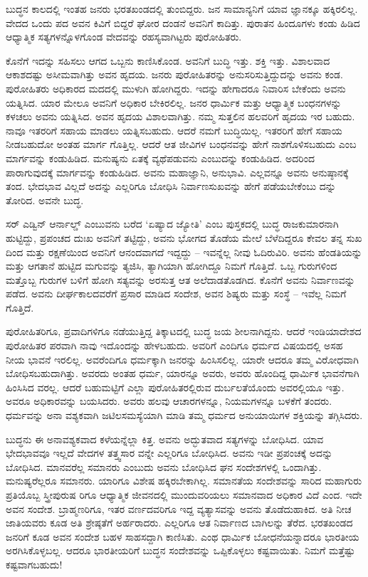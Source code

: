 ಬುದ್ಧನ ಕಾಲದಲ್ಲಿ ಇಂತಹ ಜನರು ಭರತಖಂಡದಲ್ಲಿ ತುಂಬಿದ್ದರು. ಜನ ಸಾಮಾನ್ಯನಿಗೆ ಯಾವ ಜ್ಞಾನಕ್ಕೂ ಹಕ್ಕಿರಲಿಲ್ಲ. ವೇದದ ಒಂದು ಪದ ಅವನ ಕಿವಿಗೆ ಬಿದ್ದರೆ ಘೋರ ದಂಡನೆ ಅವನಿಗೆ ಕಾದಿತ್ತು. ಪುರಾತನ ಹಿಂದೂಗಳು ಕಂಡು ಹಿಡಿದ ಆಧ್ಯಾತ್ಮಿಕ ಸತ್ಯಗಳನ್ನೊಳಗೊಂಡ ವೇದವನ್ನು ರಹಸ್ಯವಾಗಿಟ್ಟರು ಪುರೋಹಿತರು.

ಕೊನೆಗೆ ಇದನ್ನು ಸಹಿಸಲು ಆಗದ ಒಬ್ಬನು ಕಾಣಿಸಿಕೊಂಡ. ಅವನಿಗೆ ಬುದ್ಧಿ ಇತ್ತು. ಶಕ್ತಿ ಇತ್ತು. ವಿಶಾಲವಾದ ಆಕಾಶದಷ್ಟು ಅಸೀಮವಾಗಿತ್ತು ಅವನ ಹೃದಯ. ಜನರು ಪುರೋಹಿತರನ್ನು ಅನುಸರಿಸುತ್ತಿದ್ದುದನ್ನು ಅವನು ಕಂಡ. ಪುರೋಹಿತರು ಅಧಿಕಾರದ ಮದದಲ್ಲಿ ಮುಳುಗಿ ಹೋಗಿದ್ದರು. ಇದನ್ನು ಹೇಗಾದರೂ ನಿವಾರಿಸ ಬೇಕೆಂದು ಅವನು ಯತ್ನಿಸಿದ. ಯಾರ ಮೇಲೂ ಅವನಿಗೆ ಅಧಿಕಾರ ಬೇಕಿರಲಿಲ್ಲ. ಜನರ ಧಾರ್ಮಿಕ ಮತ್ತು ಆಧ್ಯಾತ್ಮಿಕ ಬಂಧನಗಳನ್ನು ಕಳಚಲು ಅವನು ಯತ್ನಿಸಿದ. ಅವನ ಹೃದಯ ವಿಶಾಲವಾಗಿತ್ತು. ನಮ್ಮ ಸುತ್ತಲಿನ ಹಲವರಿಗೆ ಹೃದಯ ಇರ ಬಹುದು. ನಾವೂ ಇತರರಿಗೆ ಸಹಾಯ ಮಾಡಲು ಯತ್ನಿಸಬಹುದು. ಆದರೆ ನಮಗೆ ಬುದ್ಧಿಯಿಲ್ಲ. ಇತರರಿಗೆ ಹೇಗೆ ಸಹಾಯ ನೀಡಬಹುದೋ ಅಂತಹ ಮಾರ್ಗ ಗೊತ್ತಿಲ್ಲ. ಆದರೆ ಆತ ಜೀವಿಗಳ ಬಂಧನವನ್ನು ಹೇಗೆ ನಾಶಗೊಳಿಸಬಹುದು ಎಂಬ ಮಾರ್ಗವನ್ನು ಕಂಡುಹಿಡಿದ. ಮನುಷ್ಯನು ಏತಕ್ಕೆ ವ್ಯಥೆಪಡುವನು ಎಂಬುದನ್ನು ಕಂಡುಹಿಡಿದ. ಅದರಿಂದ ಪಾರಾಗುವುದಕ್ಕೆ ಮಾರ್ಗವನ್ನು ಕಂಡುಹಿಡಿದ. ಅವನು ಮಹಾಜ್ಞಾನಿ, ಅನುಭಾವಿ. ಎಲ್ಲವನ್ನೂ ಅವನು ಅನುಷ್ಠಾನಕ್ಕೆ ತಂದ. ಭೇದಭಾವ ವಿಲ್ಲದೆ ಅದನ್ನು ಎಲ್ಲರಿಗೂ ಬೋಧಿಸಿ ನಿರ್ವಾಣಸುಖವನ್ನು ಹೇಗೆ ಪಡೆಯಬೇಕೆಂಬು ದನ್ನು ತೋರಿದ. ಅವನೇ ಬುದ್ಧ.

ಸರ್​ ಎಡ್ವಿನ್​ ಆರ್ನಾಲ್ಡ್​ ಎಂಬುವನು ಬರೆದ ‘ಏಷ್ಯಾದ ಜ್ಯೋತಿ’ ಎಂಬ ಪುಸ್ತಕದಲ್ಲಿ ಬುದ್ಧ ರಾಜಕುಮಾರನಾಗಿ ಹುಟ್ಟಿದ್ದು, ಪ್ರಪಂಚದ ದುಃಖ ಅವನಿಗೆ ತಟ್ಟಿದ್ದು, ಅವನು ಭೋಗದ ತೊಡೆಯ ಮೇಲೆ ಬೆಳೆದಿದ್ದರೂ ಕೇವಲ ತನ್ನ ಸುಖ ದಿಂದ ಮತ್ತು ರಕ್ಷಣೆಯಿಂದ ಅವನಿಗೆ ಆನಂದವಾಗದೆ ಇದ್ದದ್ದು – ಇವನ್ನೆಲ್ಲ ನೀವು ಓದಿರುವಿರಿ. ಅವನು ಹೆಂಡತಿಯನ್ನು ಮತ್ತು ಆಗತಾನೆ ಹುಟ್ಟಿದ ಮಗುವನ್ನು ತ್ಯಜಿಸಿ, ತ್ಯಾಗಿಯಾಗಿ ಹೋಗಿದ್ದೂ ನಿಮಗೆ ಗೊತ್ತಿದೆ. ಒಬ್ಬ ಗುರುಗಳಿಂದ ಮತ್ತೊಬ್ಬ ಗುರುಗಳ ಬಳಿಗೆ ಹೋಗಿ ಸತ್ಯವನ್ನು ಅರಸುತ್ತ ಆತ ಅಲೆದಾಡತೊಡಗಿದ. ಕೊನೆಗೆ ಅವನು ನಿರ್ವಾಣವನ್ನು ಪಡೆದ. ಅವನು ದೀರ್ಘಕಾಲದವರೆಗೆ ಪ್ರಸಾರ ಮಾಡಿದ ಸಂದೇಶ, ಅವನ ಶಿಷ್ಯರು ಮತ್ತು ಸಂಸ್ಥೆ – ಇವೆಲ್ಲ ನಿಮಗೆ ಗೊತ್ತಿದೆ.

ಪುರೋಹಿತರಿಗೂ, ಪ್ರವಾದಿಗಳಿಗೂ ನಡೆಯುತ್ತಿದ್ದ ತಿಕ್ಕಾಟದಲ್ಲಿ ಬುದ್ಧ ಜಯ ಶೀಲನಾಗಿದ್ದನು. ಆದರೆ ಇಂಡಿಯಾದೇಶದ ಪುರೋಹಿತರ ಪರವಾಗಿ ನಾವು ಇದೊಂದನ್ನು ಹೇಳಬಹುದು. ಅವರಿಗೆ ಎಂದಿಗೂ ಧರ್ಮದ ವಿಷಯದಲ್ಲಿ ಅಸಹ ನೀಯ ಭಾವನೆ ಇರಲಿಲ್ಲ. ಅವರೆಂದಿಗೂ ಧರ್ಮಕ್ಕಾಗಿ ಜನರನ್ನು ಹಿಂಸಿಸಲಿಲ್ಲ. ಯಾರೇ ಆದರೂ ತಮ್ಮ ವಿರೋಧವಾಗಿ ಬೋಧಿಸಬಹುದಾಗಿತ್ತು. ಅವರದು ಅಂತಹ ಧರ್ಮ, ಯಾರನ್ನೂ ಅವರು, ಅವರು ಹೊಂದಿದ್ದ ಧಾರ್ಮಿಕ ಭಾವನೆಗಾಗಿ ಹಿಂಸಿಸಿದ ವರಲ್ಲ. ಆದರೆ ಬಹುಮಟ್ಟಿಗೆ ಎಲ್ಲಾ ಪುರೋಹಿತರಲ್ಲಿರುವ ದುರ್ಬಲತೆಯೊಂದು ಅವರಲ್ಲಿಯೂ ಇತ್ತು. ಅವರೂ ಅಧಿಕಾರವನ್ನು ಬಯಸಿದರು. ಅವರು ಹಲವು ಆಚಾರಗಳನ್ನೂ, ನಿಯಮಗಳನ್ನೂ ಬಳಕೆಗೆ ತಂದರು. ಧರ್ಮವನ್ನು ಅನಾ ವಶ್ಯಕವಾಗಿ ಜಟಿಲಸಮಸ್ಯೆಯಾಗಿ ಮಾಡಿ ತಮ್ಮ ಧರ್ಮದ ಅನುಯಾಯಿಗಳ ಶಕ್ತಿಯನ್ನು ತಗ್ಗಿಸಿದರು.

ಬುದ್ಧನು ಈ ಅನಾವಶ್ಯಕವಾದ ಕಳೆಯನ್ನೆಲ್ಲಾ ಕಿತ್ತ. ಅವನು ಅದ್ಭುತವಾದ ಸತ್ಯಗಳನ್ನು ಬೋಧಿಸಿದ. ಯಾವ ಭೇದಭಾವವೂ ಇಲ್ಲದೆ ವೇದಗಳ ತತ್ತ್ವಸಾರ ವನ್ನೇ ಎಲ್ಲರಿಗೂ ಬೋಧಿಸಿದ. ಅವನು ಇಡೀ ಪ್ರಪಂಚಕ್ಕೆ ಅದನ್ನು ಬೋಧಿಸಿದ. ಮಾನವರೆಲ್ಲ ಸಮಾನರು ಎಂಬುದು ಅವನು ಬೋಧಿಸಿದ ಘನ ಸಂದೇಶಗಳಲ್ಲಿ ಒಂದಾಗಿತ್ತು. ಮನುಷ್ಯರೆಲ್ಲರೂ ಸಮಾನರು. ಯಾರಿಗೂ ವಿಶೇಷ ಹಕ್ಕಿರಬೇಕಾಗಿಲ್ಲ. ಸಮಾನತೆಯ ಸಂದೇಶವನ್ನು ಸಾರಿದ ಮಹಾಗುರು ಪ್ರತಿಯೊಬ್ಬ ಸ್ತ್ರೀಪುರುಷ ರಿಗೂ ಆಧ್ಯಾತ್ಮಿಕ ಜೀವನದಲ್ಲಿ ಮುಂದುವರಿಯಲು ಸಮಾನವಾದ ಅಧಿಕಾರ ವಿದೆ ಎಂದ. ಇದೇ ಅವನ ಸಂದೇಶ. ಬ್ರಾಹ್ಮಣರಿಗೂ, ಇತರ ವರ್ಣದವರಿಗೂ ಇದ್ದ ವ್ಯತ್ಯಾಸವನ್ನು ಅವನು ತೊಡೆದುಹಾಕಿದ. ಅತಿ ನೀಚ ಜಾತಿಯವರು ಕೂಡ ಅತಿ ಶ್ರೇಷ್ಠತೆಗೆ ಅರ್ಹರಾದರು. ಎಲ್ಲರಿಗೂ ಆತ ನಿರ್ವಾಣದ ಬಾಗಿಲನ್ನು ತೆರೆದ. ಭರತಖಂಡದ ಜನರಿಗೆ ಕೂಡ ಅವನ ಸಂದೇಶ ಬಹಳ ಸಾಹಸದ್ದಾಗಿ ಕಾಣಿಸಿತು. ಎಂಥ ಧಾರ್ಮಿಕ ಬೋಧನೆಯನ್ನಾದರೂ ಭಾರತೀಯ ಅರಗಿಸಿಕೊಳ್ಳಬಲ್ಲ. ಆದರೂ ಭಾರತೀಯರಿಗೆ ಬುದ್ಧನ ಸಂದೇಶವನ್ನು ಒಪ್ಪಿಕೊಳ್ಳಲು ಕಷ್ಟವಾಯಿತು. ನಿಮಗೆ ಮತ್ತೆಷ್ಟು ಕಷ್ಟವಾಗಬಹುದು!

